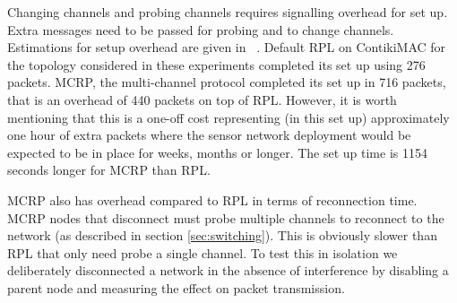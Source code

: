 Changing channels and probing channels requires signalling overhead for set up.  Extra messages need to be passed for probing and to change channels.  Estimations for setup overhead are given in ~\cite{mcrp}.  Default RPL on ContikiMAC for the topology considered in these experiments completed its set up using 276 packets. MCRP, the multi-channel protocol completed its set up in 716 packets, that is an overhead of 440 packets on top of RPL.  However, it is worth mentioning that this is a one-off cost representing (in this set up) approximately one hour of extra packets where the sensor network deployment would be expected to be in place for weeks, months or longer.  The set up time is 1154 seconds longer for MCRP than RPL.




MCRP also has overhead compared to RPL in terms of reconnection time.  MCRP nodes that disconnect must probe multiple channels to reconnect to the network (as described in section \ref{sec:switching}).  This is obviously slower than RPL that only need probe a single channel.  To test this in isolation we deliberately disconnected a network in the absence of interference by disabling a parent node and measuring the effect on packet transmission.

